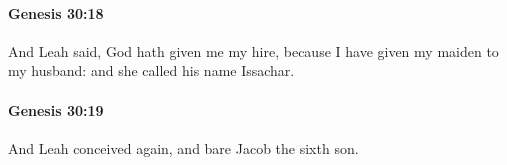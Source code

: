 		\paragraph{Genesis 30:18} %
			\label{GENESIS-30-18}

			And Leah said, God hath given me my hire, because I have given my maiden to my husband: and she called his name Issachar.


		\paragraph{Genesis 30:19} %
			\label{GENESIS-30-19}

			And Leah conceived again, and bare Jacob the sixth son.


